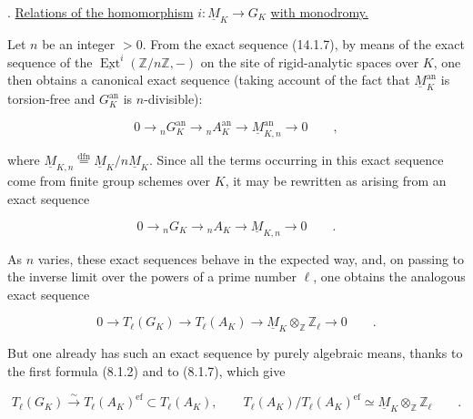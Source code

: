\par\medskip
{}. \underline{Relations of the homomorphism}
$i:\underline M_K\longrightarrow G_K$ \underline{with monodromy.}

Let $n$ be an integer $>0$.  From the exact sequence (14.1.7), by
means of the exact sequence of the
$\underline{\operatorname{Ext}}^i(\mathbb Z/n\mathbb Z,-)$ on the
site of rigid-analytic spaces over $K$, one then obtains a canonical
exact sequence (taking account of the fact that
$\underline M_K^{\mathrm{an}}$ is torsion-free and
$G_K^{\mathrm{an}}$ is $n$-divisible):

\begin{equation*}
 0\longrightarrow{}_nG_K^{\mathrm{an}}
 \longrightarrow{}_nA_K^{\mathrm{an}}
 \longrightarrow\underline M_{K,n}^{\mathrm{an}}
 \longrightarrow0\qquad ,
\end{equation*}

\noindent
where
$\underline M_{K,n}\overset{\mathrm{dfn}}{=}
\underline M_K/n\underline M_K$.  Since all the terms occurring in
this exact sequence come from finite group schemes over $K$, it may be
rewritten as arising from an exact sequence

\begin{equation}\tag{14.2.1}
 0\longrightarrow{}_nG_K\longrightarrow{}_nA_K
 \longrightarrow\underline M_{K,n}\longrightarrow0\qquad .
\end{equation}

\noindent
As $n$ varies, these exact sequences behave in the expected way, and,
on passing to the inverse limit over the powers of a prime number
$\ell$, one obtains the analogous exact sequence

\begin{equation}\tag{14.2.2}
 0\longrightarrow T_\ell(G_K)\longrightarrow T_\ell(A_K)
 \longrightarrow\underline M_K\otimes_{\mathbb Z}\mathbb Z_\ell
 \longrightarrow0\qquad .
\end{equation}

\noindent
But one already has such an exact sequence by purely algebraic means,
thanks to the first formula (8.1.2) and to (8.1.7), which give

\begin{equation}\tag{14.2.3}
 T_\ell(G_K)\xrightarrow{\ \sim\ }T_\ell(A_K)^{\mathrm{ef}}
 \subset T_\ell(A_K),\qquad
 T_\ell(A_K)/T_\ell(A_K)^{\mathrm{ef}}
 \simeq\underline M_K\otimes_{\mathbb Z}\mathbb Z_\ell\qquad .
\end{equation}


